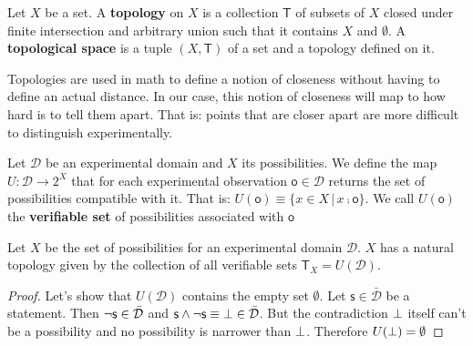 \documentclass[11pt,letterpaper,fleqn]{memoir} %
\begin{document}
\begin{mathSection}
	\begin{defn}
		Let $X$ be a set. A \textbf{topology} on $X$ is a collection $\mathsf{T}$ of subsets of $X$ closed under finite intersection and arbitrary union such that it contains $X$ and $\emptyset$. A \textbf{topological space} is a tuple $(X, \mathsf{T})$ of a set and a topology defined on it.
	\end{defn}
\end{mathSection}

Topologies are used in math to define a notion of closeness without having to define an actual distance. In our case, this notion of closeness will map to how hard is to tell them apart. That is: points that are closer apart are more difficult to distinguish experimentally.

\begin{mathSection}
	
\begin{defn}
	Let $\mathcal{D}$ be an experimental domain and $X$ its possibilities. We define the map $U : \mathcal{D} \rightarrow 2^X$ that for each experimental observation $\mathsf{o} \in \mathcal{D}$ returns the set of possibilities compatible with it. That is: $U(\mathsf{o})\equiv\{ x \in X \, | \, x \comp \mathsf{o}\}$. We call $U(\mathsf{o})$ the \textbf{verifiable set} of possibilities associated with $\mathsf{o}$
\end{defn}

\end{mathSection}

\begin{mathSection}

\begin{prop}
	Let $X$ be the set of possibilities for an experimental domain $\mathcal{D}$. $X$ has a natural topology given by the collection of all verifiable sets $\mathsf{T}_X=U(\mathcal{D})$.
\end{prop}

\begin{proof}
	Let's show that $U(\mathcal{D})$ contains the empty set $\emptyset$. Let $\mathsf{s} \in \bar{\mathcal{D}}$ be a statement. Then $\neg\mathsf{s} \in \bar{\mathcal{D}}$ and $\mathsf{s} \wedge \neg\mathsf{s} \equiv \bot \in \bar{\mathcal{D}}$. But the contradiction $\bot$ itself can't be a possibility and no possibility is narrower than $\bot$. Therefore $U(\bot) = \emptyset$
\end{proof}
\end{mathSection}
\end{document}
